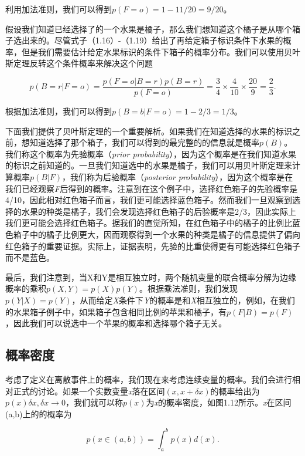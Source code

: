 	利用加法准则，我们可以得到$p(F = o) = 1 - 11/20 = 9/20$。
	
	假设我们知道已经选择了的一个水果是橘子，那么我们想知道这个橘子是从哪个箱子选出来的。尽管式子（1.16）-（1.19）给出了再给定箱子标识条件下水果的概率，但是我们需要估计给定水果标识的条件下箱子的概率分布。我们可以使用贝叶斯定理反转这个条件概率来解决这个问题
	
	\begin{equation}
	p(B = r|F = o) = \frac{p(F = o|B = r)p(B = r)}{p(F = o)} = \frac{3}{4} \times \frac{4}{10} \times \frac{20}{9}= \frac{2}{3}.
	\end{equation}
	
	根据加法准则，我们可以得到$p(B = b|F = o) = 1 -2/3 = 1/3$。
	
	下面我们提供了贝叶斯定理的一个重要解析。如果我们在知道选择的水果的标识之前，想知道选择了那个箱子，我们可以得到的最完整的的信息就是概率$p(B)$。我们称这个概率为先验概率（\textit{prior probability}），因为这个概率是在我们知道水果的标识之前知道的。一旦我们知道选中的水果是橘子，我们可以用贝叶斯定理来计算概率$p(B|F)$，我们称为后验概率（\textit{posterior probability}），因为这个概率是在我们已经观察\textit{F}后得到的概率。注意到在这个例子中，选择红色箱子的先验概率是4/10，因此相对红色箱子而言，我们更可能选择蓝色箱子。然而我们一旦观察到选择的水果的种类是橘子，我们会发现选择红色箱子的后验概率是2/3，因此实际上我们更可能会选择红色箱子。据我们的直觉所知，在红色箱子中的橘子的比例比蓝色箱子中的橘子比例更大，因而观察得到一个水果的种类是橘子的信息提供了偏向红色箱子的重要证据。实际上，证据表明，先验的比重使得更有可能选择红色箱子而不是蓝色。
	
	最后，我们注意到，当X和Y是相互独立时，两个随机变量的联合概率分解为边缘概率的乘积$p(X, Y) = p(X)p(Y)$。根据乘法准则，我们发现$p(Y|X) = p(Y)$，从而给定\textit{X}条件下\textit{Y}的概率是和\textit{X}相互独立的，例如，在我们的水果箱子例子中，如果箱子包含相同比例的苹果和橘子，有$p(F|B) = p(F)$，因此我们可以说选中一个苹果的概率和选择哪个箱子无关。
	
{\color{blue} \subsection{概率密度} }

	考虑了定义在离散事件上的概率，我们现在来考虑连续变量的概率。我们会进行相对正式的讨论。如果一个实数变量\textit{x}落在区间$(x, x + \delta x)$的概率给出为$p(x)\delta x, \delta x \to 0$，我们就可以称$p(x)$为\textit{x}的概率密度，如图1.12所示。\textit{x}在区间(a,b)上的的概率为
	
	\begin{equation}
	p(x \in (a,b)) = \int_{a}^{b} p(x) d(x).
	\end{equation}
	

